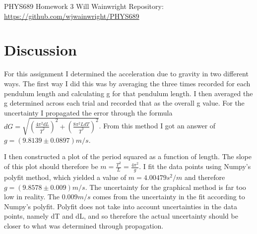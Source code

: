 \documentclass[twocolumn,11pt]{article}
\begin{document}
\pagestyle{plain}
\onecolumn
PHYS689 
\newline Homework 3
\newline Will Wainwright
\newline Repository: \href{https://github.com/wjwainwright/PHYS689}{https://github.com/wjwainwright/PHYS689}

\section*{Discussion}
For this assignment I determined the acceleration due to gravity in two different ways. The first way I did this was by averaging the three times recorded for each pendulum length and calculating g for that pendulum length. I then averaged the g determined across each trial and recorded that as the overall g value. For the uncertainty I propagated the error through the formula $dG =  \sqrt{(\frac{4\pi^2dL}{{\bar T}^2})^2 + (\frac{8\pi^2LdT}{\bar T^3})^2}$. From this method I got an answer of $g=(9.8139 \pm 0.0897) m/s$. 

I then constructed a plot of the period squared as a function of length. The slope of this plot should therefore be $m=\frac{T^2}{L} = \frac{4\pi^2}{g}$. I fit the data points using Numpy's polyfit method, which yielded a value of $m=4.00479 s^2/m$ and therefore $g=(9.8578 \pm 0.009) m/s$. The uncertainty for the graphical method is far too low in reality. The $0.009m/s$ comes from the uncertainty in the fit according to Numpy's polyfit. Polyfit does not take into account uncertainties in the data points, namely dT and dL, and so therefore the actual uncertainty should be closer to what was determined through propagation.

\begin{figure}[!h]
	\centering
	\noindent
      \caption{}
\end{figure}
\end{document}

